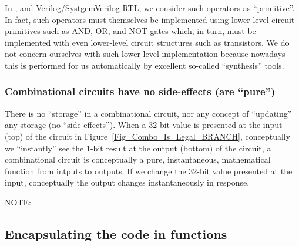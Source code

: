In {\BSV}, and Verilog/SystgemVerilog RTL, we consider such operators as
``primitive''.  In fact, such operators must themselves be implemented
using lower-level circuit primitives such as AND, OR, and NOT gates
which, in turn, must be implemented with even lower-level circuit
structures such as transistors.  We do not concern ourselves with such
lower-level implementation because nowadays this is performed for us
automatically by excellent so-called ``synthesis'' tools.


\subsubsection{Combinational circuits have no side-effects (are ``pure'')}


There is no ``storage'' in a combinational circuit, nor any concept of
``updating'' any storage (no ``side-effects'').  When a 32-bit value
is presented at the input (top) of the circuit in
Figure~\ref{Fig_Combo_Is_Legal_BRANCH}, conceptually we
``instantly'' see the 1-bit result at the output (bottom) of the
circuit, {\ie} a combinational circuit is conceptually a pure,
instantaneous, mathematical function from intputs to outputs.  If we
change the 32-bit value presented at the input, conceptually the
output changes instantaneously in response.



NOTE: 



\subsection{Encapsulating the code in functions}

